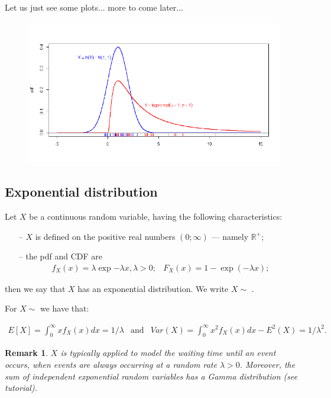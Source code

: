 \documentclass[notes=show,smaller,handout]{beamer}\usepackage[]{graphicx}\usepackage[]{color}
\newtheorem{remark}{Remark}[section]
\newcommand{\bea}{\begin{eqnarray}}
\newcommand{\eea}{\end{eqnarray}}
\newcommand{\nn}{\nonumber}
\begin{document}
\begin{frame}{\subsecname}
  Let us just see some plots... more to come later...
  \begin{figure}[ptb]\centering
  \includegraphics[height=2.4856in, width=4.5in]{img/lognormal_with_rug__8.pdf}%
  \end{figure}
\end{frame}

\subsection{Exponential distribution}

\begin{frame}{\subsecname}
  \begin{definition}
  Let $X$ be a  continuous random variable, having the following  characteristics:
  \begin{itemize}
  \item[--]       $X$ is defined on the positive real numbers $\left( 0;\infty \right) $ --- namely $\mathbb{R}^+$;
  \item[--]       the pdf and CDF are
  \bea
  f_X(x)=\lambda \exp{ -\lambda x},\lambda
  >0; &
  F_X(x)=1-\exp (-\lambda x); \nn \eea
  \end{itemize}
  then we say that $X$ has an exponential distribution. We write $X\sim$ .
  \end{definition}

  For $X\sim$  we have that:
  \begin{small}
  \bea
  E[X]=\int_{0}^{\infty }xf_X(x )dx= 1/\lambda & \text{and} &   Var(X)=\int_{0}^{\infty }x^{2}f_X(x )dx-E^{2}(X)=1/\lambda ^{2}. \nn
  \eea
  \end{small}

  \begin{remark}
  $X$ is typically applied to model the waiting time until an event occurs, when events are always occurring at a random rate $\lambda >0$. Moreover, the sum of independent exponential random variables has a Gamma distribution (see tutorial).
  \end{remark}
\end{frame}
\end{document}
